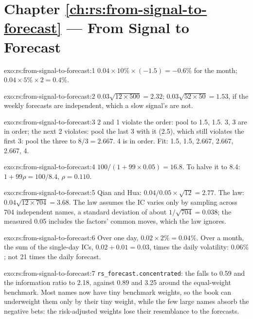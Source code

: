 \section*{Chapter \ref{ch:rs:from-signal-to-forecast} --- From Signal to Forecast}

\begin{solution}{exo:rs:from-signal-to-forecast:1}
$0.04 \times 10\% \times (-1.5) = -0.6\%$ for the month; $0.04 \times 5\% \times 2 = 0.4\%$.
\end{solution}

\begin{solution}{exo:rs:from-signal-to-forecast:2}
$0.03\sqrt{12 \times 500} = 2.32$; $0.03\sqrt{52 \times 50} = 1.53$, if the weekly forecasts are independent, which a slow signal's are not.
\end{solution}

\begin{solution}{exo:rs:from-signal-to-forecast:3}
2 and 1 violate the order: pool to 1.5, 1.5. 3, 3 are in order; the next 2 violates: pool the last 3 with it (2.5), which still violates the first 3:
pool the three to $8/3 = 2.667$. 4 is in order. Fit: 1.5, 1.5, 2.667, 2.667, 2.667, 4.
\end{solution}

\begin{solution}{exo:rs:from-signal-to-forecast:4}
$100/(1 + 99 \times 0.05) = 16.8$. To halve it to 8.4: $1 + 99\rho = 100/8.4$, $\rho = 0.110$.
\end{solution}

\begin{solution}{exo:rs:from-signal-to-forecast:5}
Qian and Hua: $0.04/0.05 \times \sqrt{12} = 2.77$. The law: $0.04\sqrt{12 \times 704} = 3.68$. The law assumes the IC varies only by sampling
across 704 independent names, a standard deviation of about $1/\sqrt{704} = 0.038$; the measured 0.05 includes the factors' common moves, which the
law ignores.
\end{solution}

\begin{solution}{exo:rs:from-signal-to-forecast:6}
Over one day, $0.02 \times 2\% = 0.04\%$. Over a month, the sum of the single-day ICs, $0.02 + 0.01 = 0.03$, times the daily volatility: $0.06\%$; not
21 times the daily forecast.
\end{solution}

\begin{solution}{exo:rs:from-signal-to-forecast:7}
\texttt{rs\_forecast.concentrated}: the  falls to 0.59 and the information ratio to 2.18, against 0.89 and 3.25 around the equal-weight
benchmark. Most names now have tiny benchmark weights, so the book can underweight them only by their tiny weight, while the few large names absorb the
negative bets: the risk-adjusted weights lose their resemblance to the forecasts.
\end{solution}

